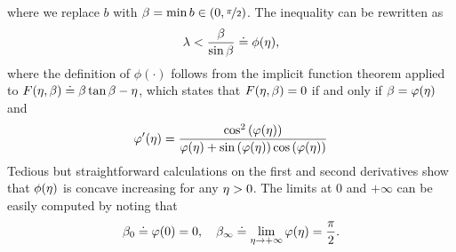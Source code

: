 where we replace $ b $ with $ \beta = \min b \in (0,\nicefrac{\pi}{2}) $.
The inequality can be rewritten as
\begin{equation}\label{eq:stability-condition-lambda}
	\lambda < \dfrac{\beta}{\sin\beta} \doteq \phi(\eta),
\end{equation}
where the definition of $ \phi(\cdot) $ follows from the implicit function theorem
applied to $ F(\eta,\beta) \doteq \beta\tan\beta - \eta $,
which states that $ F(\eta,\beta) = 0 $ if and only if $ \beta = \varphi(\eta) $ and
\begin{equation}\label{eq:varphi-of-eta-derivative}
	\varphi'(\eta) = \dfrac{\cos^2\left(\varphi(\eta)\right)}{\varphi(\eta) + \sin\left(\varphi(\eta)\right)\cos\left(\varphi(\eta)\right)}
\end{equation}
Tedious but straightforward calculations on the first and second derivatives %
show that $ \phi(\eta) $ is concave increasing for any $ \eta > 0 $.
The limits at $ 0 $ and $ +\infty $ can be easily computed
by noting that
\begin{equation}\label{eq:stability-condition-limits}
	\beta_0\doteq\varphi(0) = 0, \quad \beta_\infty\doteq\lim_{\eta\rightarrow+\infty}\varphi(\eta) = \dfrac{\pi}{2}.
\end{equation}




